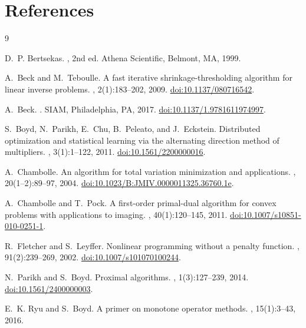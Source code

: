 \documentclass[11pt]{article}
\theoremstyle{plain}
\theoremstyle{remark}
\begin{document}
\section*{References}

\begin{thebibliography}{9}

D.~P. Bertsekas.
, 2nd ed.
\newblock Athena Scientific, Belmont, MA, 1999.

A.~Beck and M.~Teboulle.
\newblock A fast iterative shrinkage-thresholding algorithm for linear inverse
  problems.
, 2(1):183--202, 2009.
\newblock \href{https://doi.org/10.1137/080716542}{doi:10.1137/080716542}.

A.~Beck.
.
\newblock SIAM, Philadelphia, PA, 2017.
\newblock \href{https://doi.org/10.1137/1.9781611974997}%
  {doi:10.1137/1.9781611974997}.

S.~Boyd, N.~Parikh, E.~Chu, B.~Peleato, and J.~Eckstein.
\newblock Distributed optimization and statistical learning via the alternating
  direction method of multipliers.
, 3(1):1--122, 2011.
\newblock \href{https://doi.org/10.1561/2200000016}{doi:10.1561/2200000016}.

A.~Chambolle.
\newblock An algorithm for total variation minimization and applications.
, 20(1--2):89--97,
  2004.
\newblock \href{https://doi.org/10.1023/B:JMIV.0000011325.36760.1e}{doi:10.1023/B:JMIV.0000011325.36760.1e}.

A.~Chambolle and T.~Pock.
\newblock A first-order primal-dual algorithm for convex problems with
  applications to imaging.
, 40(1):120--145,
  2011.
\newblock \href{https://doi.org/10.1007/s10851-010-0251-1}{doi:10.1007/s10851-010-0251-1}.

R.~Fletcher and S.~Leyffer.
\newblock Nonlinear programming without a penalty function.
, 91(2):239--269, 2002.
\newblock \href{https://doi.org/10.1007/s101070100244}{doi:10.1007/s101070100244}.

N.~Parikh and S.~Boyd.
\newblock Proximal algorithms.
, 1(3):127--239, 2014.
\newblock \href{https://doi.org/10.1561/2400000003}{doi:10.1561/2400000003}.

E.~K. Ryu and S.~Boyd.
\newblock A primer on monotone operator methods.
, 15(1):3--43, 2016.

\end{thebibliography}
\end{document}
